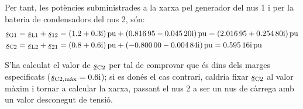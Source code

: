 \begin{exemple}
    Per tant, les potències subministrades a la xarxa pel generador del
    nus 1 i per la bateria de condensadors del nus 2, són:
    \begin{align*}
     \cmplx{s}\ped{G1} &= \cmplx{s}\ped{L1} + \cmplx{s}_{12} = \complexqty{1,2+j0,3}{pu} + \complexqty{0,81695 - j 0,04520}{pu} =
     \complexqty{2,01695 + j 0,25480}{pu} \\
     \cmplx{s}\ped{C2} &= \cmplx{s}\ped{L2} + \cmplx{s}_{21} = \complexqty{0,8+j0,6}{pu} + \complexqty{-0,80000 - j 0,00484}{pu} =
     \complexqty{  j 0,59516}{pu}
    \end{align*}

    S'ha calculat el valor de $\cmplx{s}\ped{C2}$ per tal de comprovar
    que és dins dels marges especificats
    ($\cmplx{s}\ped{C2,\text{màx}}=\complexnum{j0,6}$); si es donés el cas contrari,
    caldria fixar $\cmplx{s}\ped{C2}$ al  valor màxim i tornar a
    calcular la xarxa, passant el nus 2 a ser un nus de càrrega amb
    un valor  desconegut de tensió.
\end{exemple}

